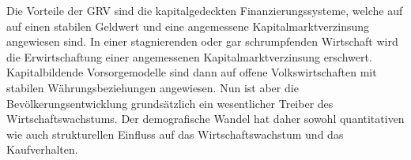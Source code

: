 Die Vorteile der GRV sind die kapitalgedeckten Finanzierungssysteme, welche auf 
auf einen stabilen Geldwert und eine angemessene Kapitalmarktverzinsung angewiesen sind.
In einer stagnierenden oder gar schrumpfenden Wirtschaft wird die Erwirtschaftung 
einer angemessenen Kapitalmarktverzinsung erschwert. Kapitalbildende Vorsorgemodelle 
sind dann auf offene Volkswirtschaften mit stabilen Währungsbeziehungen angewiesen.
Nun ist aber die Bevölkerungsentwicklung grundsätzlich ein wesentlicher Treiber
des Wirtschaftswachstums. Der demografische Wandel hat daher sowohl quantitativen 
wie auch strukturellen Einfluss auf das Wirtschaftswachstum und das
Kaufverhalten.



